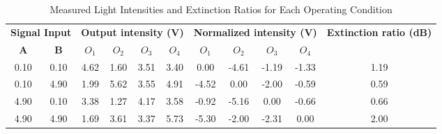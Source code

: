 \documentclass{article}
\begin{document}
\begin{table}[ht]
\centering
\caption{Measured Light Intensities and Extinction Ratios for Each Operating Condition}
\label{tab:extinction_ratios}
\begin{adjustbox}{max width=\textwidth}
\begin{tabular}{cc|cccc|cccc|c}
\toprule
\multicolumn{2}{c|}{\textbf{Signal Input}} & \multicolumn{4}{c|}{\textbf{Output intensity (V)}} & \multicolumn{4}{c|}{\textbf{Normalized intensity (V)}} & \multirow{2}{*}{\textbf{Extinction ratio (dB)}} \\
\cmidrule{1-10}
\textbf{A} & \textbf{B} & $O_1$ & $O_2$ & $O_3$ & $O_4$ & $O_1$ & $O_2$ & $O_3$ & $O_4$ & \\
\midrule
0.10 & 0.10 & 4.62 & 1.60 & 3.51 & 3.40 & 0.00 & -4.61 & -1.19 & -1.33 & 1.19 \\
0.10 & 4.90 & 1.99 & 5.62 & 3.55 & 4.91 & -4.52 & 0.00 & -2.00 & -0.59 & 0.59 \\
4.90 & 0.10 & 3.38 & 1.27 & 4.17 & 3.58 & -0.92 & -5.16 & 0.00 & -0.66 & 0.66 \\
4.90 & 4.90 & 1.69 & 3.61 & 3.37 & 5.73 & -5.30 & -2.00 & -2.31 & 0.00 & 2.00 \\
\bottomrule
\end{tabular}
\end{adjustbox}
\end{table}
\end{document}
